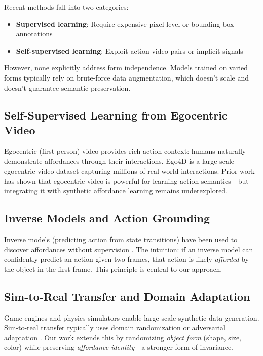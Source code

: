 \documentclass[11pt]{article}
\begin{document}
Recent methods fall into two categories:
\begin{itemize}
    \item \textbf{Supervised learning}: Require expensive pixel-level or bounding-box annotations \cite{roy2023learning, lim2021affordance}
    \item \textbf{Self-supervised learning}: Exploit action-video pairs or implicit signals \cite{ha2018world, pathak2019learning}
\end{itemize}

However, none explicitly address form independence. Models trained on varied forms typically rely on brute-force data augmentation, which doesn't scale and doesn't guarantee semantic preservation.

\subsection{Self-Supervised Learning from Egocentric Video}

Egocentric (first-person) video provides rich action context: humans naturally demonstrate affordances through their interactions. Ego4D \cite{grauman2024ego4d} is a large-scale egocentric video dataset capturing millions of real-world interactions. Prior work \cite{wang2023learning, zellers2024understanding} has shown that egocentric video is powerful for learning action semantics—but integrating it with synthetic affordance learning remains underexplored.

\subsection{Inverse Models and Action Grounding}

Inverse models (predicting action from state transitions) have been used to discover affordances without supervision \cite{ha2018world, pathak2019learning}. The intuition: if an inverse model can confidently predict an action given two frames, that action is likely \textit{afforded} by the object in the first frame. This principle is central to our approach.

\subsection{Sim-to-Real Transfer and Domain Adaptation}

Game engines and physics simulators enable large-scale synthetic data generation. Sim-to-real transfer typically uses domain randomization \cite{tobin2017domain, peng2018sim} or adversarial adaptation \cite{ganin2015unsupervised}. Our work extends this by randomizing \textit{object form} (shape, size, color) while preserving \textit{affordance identity}—a stronger form of invariance.
\end{document}
